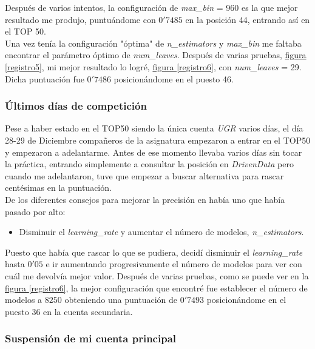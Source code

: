 \documentclass[paper=a4, fontsize=12pt]{article} %
\numberwithin{equation}{section} %
\numberwithin{figure}{section} %
\numberwithin{table}{section} %
\begin{document}
Después de varios intentos, la configuración de \textit{max\_bin} = 960 es la que mejor resultado me produjo, puntuándome con $0'7485$ en la posición 44, entrando así en el TOP 50.\\

Una vez tenía la configuración "óptima" de \textit{n\_estimators} y \textit{max\_bin} me faltaba encontrar el parámetro óptimo de \textit{num\_leaves}. Después de varias pruebas, \hyperref[registro5]{figura \ref*{registro5}}, mi mejor resultado lo logré, \hyperref[registro6]{figura \ref*{registro6}}, con \textit{num\_leaves} = 29. Dicha puntuación fue $0'7486$ posicionándome en el puesto 46.

\subsubsection {Últimos días de competición}
Pese a haber estado en el TOP50 siendo la única cuenta \textit{UGR} varios días, el día 28-29 de Diciembre compañeros de la asignatura empezaron a entrar en el TOP50 y empezaron a adelantarme. Antes de ese momento llevaba varios días sin tocar la práctica, entrando simplemente a consultar la posición en \textit{DrivenData} pero cuando me adelantaron, tuve que empezar a buscar alternativa para rascar centésimas en la puntuación.\\

De los diferentes consejos para mejorar la precisión en \cite{tuning} había uno que había pasado por alto:

\begin{itemize}
\item Disminuir el \textit{learning\_rate} y aumentar el número de modelos, \textit{n\_estimators}.
\end{itemize}

Puesto que había que rascar lo que se pudiera, decidí disminuir el \textit{learning\_rate} hasta $0'05$ e ir aumentando progresivamente el número de modelos para ver con cuál me devolvía mejor valor. Después de varias pruebas, como se puede ver en la \hyperref[registro6]{figura \ref*{registro6}}, la mejor configuración que encontré fue establecer el número de modelos a $8250$ obteniendo una puntuación de $0'7493$ posicionándome en el puesto 36 en la cuenta secundaria. \\

\subsubsection{Suspensión de mi cuenta principal}
\end{document}
